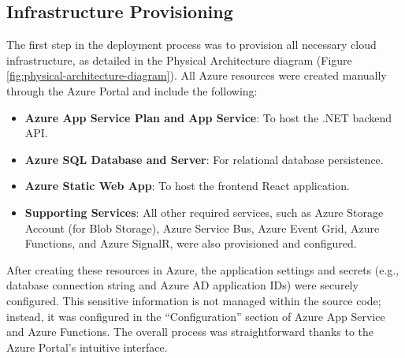\subsection{Infrastructure Provisioning}

The first step in the deployment process was to provision all necessary cloud infrastructure, as detailed in the Physical Architecture diagram (Figure \ref{fig:physical-architecture-diagram}). All Azure resources were created manually through the Azure Portal and include the following:

\begin{itemize}  [leftmargin=0.75cm, label=$\bullet$]
    \item \textbf{Azure App Service Plan and App Service}: To host the .NET backend API.

    \item \textbf{Azure SQL Database and Server}: For relational database persistence.

    \item \textbf{Azure Static Web App}: To host the frontend React application.

    \item \textbf{Supporting Services}: All other required services, such as Azure Storage Account (for Blob Storage), Azure Service Bus, Azure Event Grid, Azure Functions, and Azure SignalR, were also provisioned and configured.

\end{itemize}

After creating these resources in Azure, the application settings and secrets (e.g., database connection string and Azure AD application IDs) were securely configured. This sensitive information is not managed within the source code; instead, it was configured in the “Configuration” section of Azure App Service and Azure Functions. The overall process was straightforward thanks to the Azure Portal's intuitive interface.
